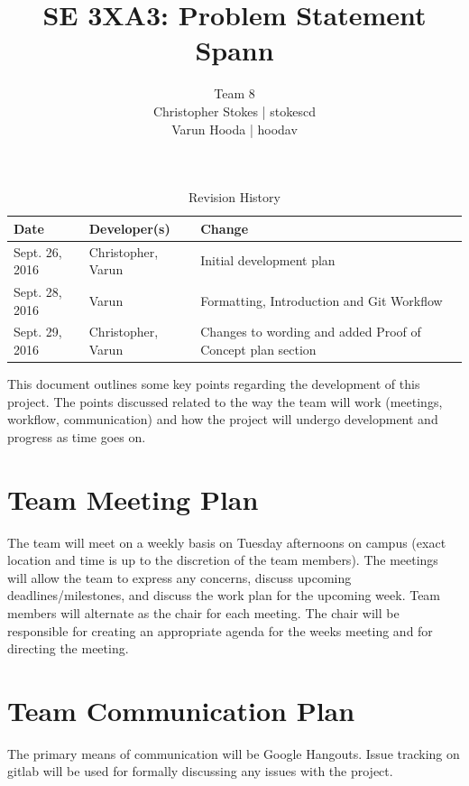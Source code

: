\documentclass{article}
\title{SE 3XA3: Problem Statement\\Spann}
\author{Team 8
		\\ Christopher Stokes | stokescd
		\\ Varun Hooda | hoodav
}
\date{}
\begin{document}
\begin{table}[hp]
\caption{Revision History} \label{TblRevisionHistory}
\begin{tabularx}{\textwidth}{llX}
\toprule
\textbf{Date} & \textbf{Developer(s)} & \textbf{Change}\\
\midrule
    Sept. 26, 2016 & Christopher, Varun & Initial development plan\\
    Sept. 28, 2016 & Varun & Formatting, Introduction and Git Workflow\\
    Sept. 29, 2016 & Christopher, Varun & Changes to wording and added Proof of
    Concept plan section\\
\bottomrule
\end{tabularx}
\end{table}

\newpage

\maketitle

This document outlines some key points regarding the development of this
project. The points discussed related to the way the team will work (meetings,
workflow, communication) and how the project will undergo development and
progress as time goes on.

\section{Team Meeting Plan}
The team will meet on a weekly basis on Tuesday afternoons on campus (exact
location and time is up to the discretion of the team members). The meetings
will allow the team to express any concerns, discuss upcoming
deadlines/milestones, and discuss the work plan for the upcoming week. Team
members will alternate as the chair for each meeting. The chair will be
responsible for creating an appropriate agenda for the weeks meeting and for
directing the meeting.

\section{Team Communication Plan}
The primary means of communication will be Google Hangouts. Issue tracking on
gitlab will be used for formally discussing any issues with the project.
\end{document}
